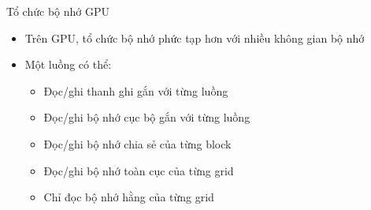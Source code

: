 \documentclass[10pt]{beamer}
\theoremstyle{remark}
\numberwithin{algocf}{section}
\numberwithin{equation}{section}
\numberwithin{dl}{section}
\numberwithin{figure}{section}
\begin{document}
\begin{frame}{Tổ chức bộ nhớ GPU}
    \begin{itemize}
        \item Trên GPU, tổ chức bộ nhớ phức tạp hơn với nhiều không gian bộ nhớ
        \item Một luồng có thể:
        \begin{itemize}
            \item Đọc/ghi thanh ghi gắn với từng luồng 
            \item Đọc/ghi bộ nhớ cục bộ gắn với từng luồng 
            \item Đọc/ghi bộ nhớ chia sẻ của từng block 
            \item Đọc/ghi bộ nhớ toàn cục của từng grid 
            \item Chỉ đọc bộ nhớ hằng của từng grid
        \end{itemize}
    \end{itemize}
\end{frame}
\end{document}
